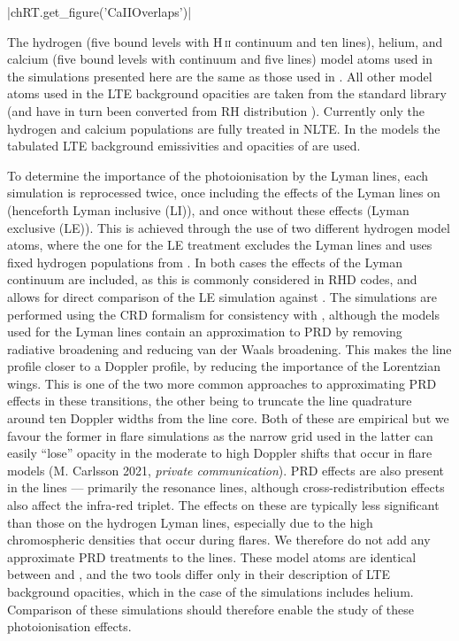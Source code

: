 \py[TimeDepRT]|chRT.get_figure('CaIIOverlaps')|

The hydrogen (five bound levels with H\,\textsc{ii} continuum and ten lines), helium, and calcium (five bound \Caii{} levels with \Caiii{} continuum and five lines) model atoms used in the simulations presented here are the same as those used in \Radyn{}.
All other model atoms used in the LTE background opacities are taken from the \Lw{} standard library (and have in turn been converted from  RH distribution \citep{Uitenbroek2001}).
Currently only the hydrogen and calcium populations are fully treated in NLTE.
In the \Radyn{} models the tabulated LTE background emissivities and opacities of \citet{Gustafsson1973} are used.

To determine the importance of the photoionisation by the Lyman lines, each \Radyn{} simulation is reprocessed twice, once including the effects of the Lyman lines on \Caii{} (henceforth Lyman inclusive (LI)), and once without these effects (Lyman exclusive (LE)).
This is achieved through the use of two different hydrogen model atoms, where the one for the LE treatment excludes the Lyman lines and uses fixed hydrogen populations from \Radyn{}.
In both cases the effects of the Lyman continuum are included, as this is commonly considered in RHD codes, and allows for direct comparison of the LE simulation against \Radyn{}.
The simulations are performed using the CRD formalism for consistency with \Radyn{}, although the models used for the Lyman lines contain an approximation to PRD by removing radiative broadening and reducing van der Waals broadening.
This makes the line profile closer to a Doppler profile, by reducing the importance of the Lorentzian wings.
This is one of the two more common approaches to approximating PRD effects in these transitions, the other being to truncate the line quadrature around ten Doppler widths from the line core.
Both of these are empirical but we favour the former in flare simulations as the narrow grid used in the latter can easily ``lose'' opacity in the moderate to high Doppler shifts that occur in flare models (M. Carlsson 2021, \emph{private communication}).
PRD effects are also present in the \Caii{} lines --- primarily the resonance lines, although cross-redistribution effects also affect the infra-red triplet.
The effects on these are typically less significant than those on the hydrogen Lyman lines, especially due to the high chromospheric densities that occur during flares.
We therefore do not add any approximate PRD treatments to the \Caii{} lines.
These model atoms are identical between \Radyn{} and \Lw{}, and the two tools differ only in their description of LTE background opacities, which in the case of the \Lw{} simulations includes helium.
Comparison of these simulations should therefore enable the study of these photoionisation effects.

